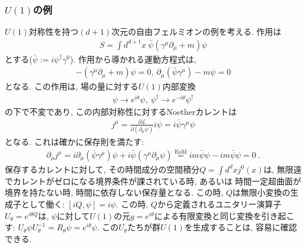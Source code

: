 \documentclass{ltjsarticle}
\theoremstyle{mystyle} %
\numberwithin{equation}{section}
\begin{document}
\subsubsection{$U(1)$の例}
$U(1)$対称性を持つ$(d+1)$次元の自由フェルミオンの例を考える. 作用は
\begin{align}
    S = \int d^{d+1} x~ \bar{\psi}(\gamma^\mu\partial_\mu + m)\psi
\end{align}
とする($\bar{\psi}:= i\psi^{\dagger}\gamma^0$). 作用から導かれる運動方程式は, 
\begin{align}
    -(\gamma^\mu \partial_\mu + m)\psi = 0, ~
    \partial_\mu(\bar{\psi}\gamma^\mu) -m\psi = 0
\end{align}
となる. 
この作用は, 場の量に対する$U(1)$内部変換
\begin{align}
    \psi\to e^{i\theta}\psi, ~ \psi^\dagger \to e^{-i\theta}\psi^{\dagger}
\end{align}
の下で不変であり, この内部対称性に対するNoetherカレントは
\begin{align}
    j^\mu = \frac{\partial \mathcal{L}}{\partial(\partial_\mu \psi)}i\psi = i\bar{\psi}\gamma^\mu \psi
\end{align}
となる. これは確かに保存則を満たす: 
\begin{align}
    \partial_\mu j^{\mu}
    =i\partial_\mu(\bar{\psi}\gamma^\mu )\psi + i\bar{\psi}(\gamma^\mu\partial_{\mu}\psi)
    \stackrel{\mathrm{EoM}}{=}im\bar{\psi}\psi - im\bar{\psi}\psi = 0~.
\end{align}
保存するカレントに対して, その時間成分の空間積分$Q=\int d^d x j^{0}(x)$は, 無限遠でカレントがゼロになる境界条件が課されている時, あるいは
時間一定超曲面が境界を持たない時, 時間に依存しない保存量となる. 
この時, $Q$は無限小変換の生成子として働く: $[iQ, \psi]=i\psi$. この時, 
$Q$から定義されるユニタリー演算子$U_\theta = e^{i\theta Q}$は, $\psi$に対して$U(1)$の元$g=e^{i\theta}$による有限変換と同じ変換を引き起こす: 
$U_{\theta}\psi U^{-1}_{\theta} = R_\theta \psi = e^{i\theta}\psi$. 
この$U_\theta$たちが群$U(1)$を生成することは, 容易に確認できる. 
\end{document}

